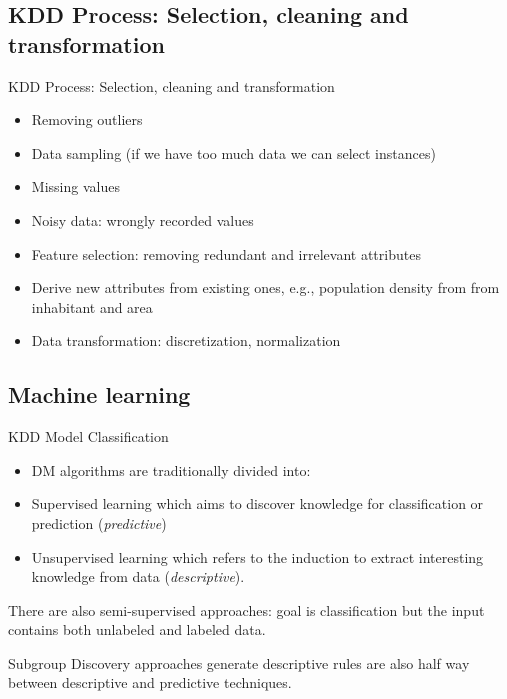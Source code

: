 \documentclass{beamer}
\begin{document}
\subsection{KDD Process: Selection, cleaning and transformation}

\begin{frame}{KDD Process: Selection, cleaning and transformation}

\begin{itemize}
 \item Removing outliers
 \item Data sampling (if we have too much data we can select instances)
 \item Missing values
 \item Noisy data: wrongly recorded values
 \item Feature selection: removing redundant and irrelevant attributes
 \item Derive new attributes from existing ones, e.g., population density from from inhabitant and area
 \item Data transformation: discretization, normalization
\end{itemize}


\end{frame}


\subsection{Machine learning}

\begin{frame}{KDD Model Classification}

\begin{itemize}
 \item DM algorithms are traditionally divided into:
 \item \alert{Supervised learning} which aims to discover knowledge for classification or prediction (\emph{predictive})
 \item \alert{Unsupervised learning} which refers to the induction to extract interesting knowledge from data (\emph{descriptive}).

\end{itemize}

There are also semi-supervised approaches: goal is classification but the input contains both unlabeled and labeled data.

Subgroup Discovery approaches generate descriptive rules are also half way between descriptive and predictive techniques.

\end{frame}
\end{document}
